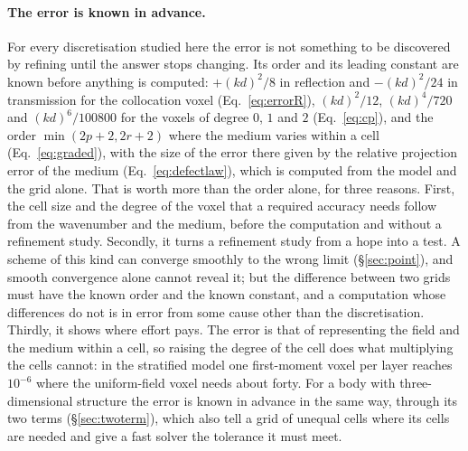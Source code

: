 \documentclass[11pt,a4paper]{article}
\begin{document}
\paragraph{The error is known in advance.} For every discretisation studied here the error is not
something to be discovered by refining until the answer stops changing. Its order and its leading
constant are known before anything is computed: $+(kd)^2/8$ in reflection and $-(kd)^2/24$ in
transmission for the collocation voxel (Eq.~\eqref{eq:errorR}), $(kd)^2/12$, $(kd)^4/720$ and
$(kd)^6/100800$ for the voxels of degree $0$, $1$ and $2$ (Eq.~\eqref{eq:cp}), and the order
$\min(2p+2,2r+2)$ where the medium varies within a cell (Eq.~\eqref{eq:graded}), with the size of the
error there given by the relative projection error of the medium (Eq.~\eqref{eq:defectlaw}), which is
computed from the model and the grid alone. That is worth more than
the order alone, for three reasons. First, the cell size and the degree of the voxel that a required
accuracy needs follow from the wavenumber and the medium, before the computation and without a
refinement study. Secondly, it turns a refinement study from a hope into a test. A scheme of this kind
can converge smoothly to the wrong limit (\S\ref{sec:point}), and smooth convergence alone cannot
reveal it; but the difference between two grids must have the known order and the known constant, and
a computation whose differences do not is in error from some cause other than the discretisation.
Thirdly, it shows where effort pays. The error is that of representing the field and the medium within
a cell, so raising the degree of the cell does what multiplying the cells cannot: in the stratified
model one first-moment voxel per layer reaches $10^{-6}$ where the uniform-field voxel needs about forty.
For a body with three-dimensional structure the error is known in advance in the same way, through
its two terms (\S\ref{sec:twoterm}), which also tell a grid of unequal cells where its cells are needed
and give a fast solver the tolerance it must meet.
\end{document}
